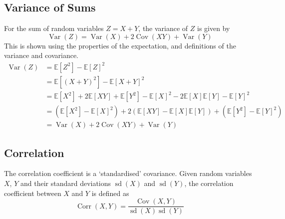 \documentclass[11pt]{report} %
\begin{document}
\subsection{Variance of Sums}

For the sum of random variables $Z = X + Y$, the variance of $Z$ is given by
\begin{equation}
\operatorname{Var}\left(Z\right) = \operatorname{Var}\left(X\right) + 2\operatorname{Cov}\left(XY\right) + \operatorname{Var}\left(Y\right)
\end{equation}
This is shown using the properties of the expectation, and definitions of the variance and covariance.
\begin{align}
\operatorname{Var}\left(Z\right) &= \mathbb{E}\left[Z^{2}\right] - \mathbb{E}\left[Z\right]^{2} \\
&= \mathbb{E}\left[\left(X + Y\right)^{2}\right] - \mathbb{E}\left[X + Y\right]^{2} \\
&= \mathbb{E}\left[X^{2}\right] + 2\mathbb{E}\left[XY\right] + \mathbb{E}\left[Y^{2}\right] - \mathbb{E}\left[X\right]^{2} - 2\mathbb{E}\left[X\right]\mathbb{E}\left[Y\right] - \mathbb{E}\left[Y\right]^{2} \\
&= \left(\mathbb{E}\left[X^{2}\right] - \mathbb{E}\left[X\right]^{2}\right) + 2\left(\mathbb{E}\left[XY\right] - \mathbb{E}\left[X\right]\mathbb{E}\left[Y\right]\right) + \left(\mathbb{E}\left[Y^{2}\right] - \mathbb{E}\left[Y\right]^{2}\right) \\
&= \operatorname{Var}\left(X\right) + 2\operatorname{Cov}\left(XY\right) + \operatorname{Var}\left(Y\right)
\end{align}

\subsection{Correlation}

The correlation coefficient is a `standardised' covariance. Given random variables $X$, $Y$ and their standard deviations $\operatorname{sd}\left(X\right)$ and $\operatorname{sd}\left(Y\right)$, the correlation coefficient between $X$ and $Y$ is defined as
\begin{equation}
\operatorname{Corr}\left(X, Y\right) = \dfrac{\operatorname{Cov}\left(X, Y\right)}{\operatorname{sd}\left(X\right)\operatorname{sd}\left(Y\right)}
\end{equation}
\end{document}

